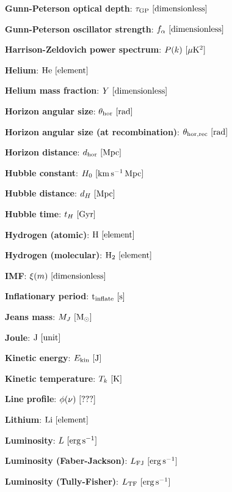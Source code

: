 \documentclass[a4paper,11pt]{article}
\begin{document}
{\noindent}\textbf{Gunn-Peterson optical depth}: $\tau_\mathrm{GP} ~ [{\rm dimensionless}]$

{\noindent}\textbf{Gunn-Peterson oscillator strength}: $f_\alpha ~ [{\rm dimensionless}]$

{\noindent}\textbf{Harrison-Zeldovich power spectrum}: $P(k) ~ [{\rm \mu K^2}]$

{\noindent}\textbf{Helium}: ${\rm He} ~ [{\rm element}]$

{\noindent}\textbf{Helium mass fraction}: $Y ~ [{\rm dimensionless}]$

{\noindent}\textbf{Horizon angular size}: $\theta_\mathrm{hor} ~ [{\rm rad}]$

{\noindent}\textbf{Horizon angular size (at recombination)}: $\theta_\mathrm{hor,rec} ~ [{\rm rad}]$

{\noindent}\textbf{Horizon distance}: $d_\mathrm{hor} ~ [{\rm Mpc}]$

{\noindent}\textbf{Hubble constant}: $H_0 ~ [{\rm km\,s^{-1}\,Mpc}]$

{\noindent}\textbf{Hubble distance}: $d_H ~ [{\rm Mpc}]$

{\noindent}\textbf{Hubble time}: $t_H ~ [{\rm Gyr}]$

{\noindent}\textbf{Hydrogen (atomic)}: ${\rm H} ~ [{\rm element}]$

{\noindent}\textbf{Hydrogen (molecular)}: ${\rm H_2} ~ [{\rm element}]$

{\noindent}\textbf{IMF}: $\xi(m) ~ [{\rm dimensionless}]$

{\noindent}\textbf{Inflationary period}: ${\rm t_\mathrm{inflate}} ~ [{\rm s}]$

{\noindent}\textbf{Jeans mass}: $M_J ~ [{\rm M_\odot}]$

{\noindent}\textbf{Joule}: ${\rm J} ~ [{\rm unit}]$

{\noindent}\textbf{Kinetic energy}: $E_\mathrm{kin} ~ [{\rm J}]$

{\noindent}\textbf{Kinetic temperature}: $T_k ~ [{\rm K}]$

{\noindent}\textbf{Line profile}: $\phi(\nu) ~ [{\rm ???}]$

{\noindent}\textbf{Lithium}: ${\rm Li} ~ [{\rm element}]$

{\noindent}\textbf{Luminosity}: $L ~ [{\rm erg\,s^{-1}}]$

{\noindent}\textbf{Luminosity (Faber-Jackson)}: $L_\mathrm{FJ} ~ [{\rm erg\,s^{-1}}]$

{\noindent}\textbf{Luminosity (Tully-Fisher)}: $L_\mathrm{TF} ~ [{\rm erg\,s^{-1}}]$
\end{document}
